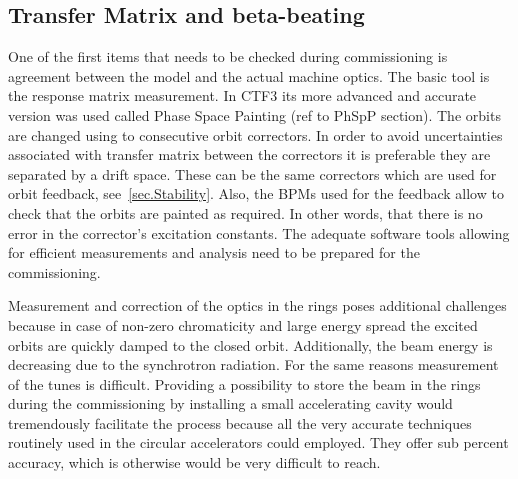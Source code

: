 \subsection{Transfer Matrix and beta-beating}

One of the first items that needs to be checked during commissioning is 
agreement between the model and the actual machine optics.
The basic tool is the response matrix measurement. 
In CTF3 its more advanced and accurate version was used called Phase Space Painting (ref to PhSpP section).
The orbits are changed using to consecutive orbit correctors. In order to avoid uncertainties associated 
with transfer matrix between the correctors it is preferable they are separated by a drift space.
These can be the same correctors which are used for orbit feedback, see~\ref{sec.Stability}. 
Also, the BPMs used for the feedback allow to check that the orbits are painted as required.
In other words, that there is no error in the corrector's excitation constants.
The adequate software tools allowing for efficient measurements and analysis need to be prepared for the commissioning.

Measurement and correction of the optics in the rings poses additional challenges
because in case of non-zero chromaticity and large energy spread the excited orbits are quickly damped to
the closed orbit. Additionally, the beam energy is decreasing due to the synchrotron radiation.
For the same reasons measurement of the tunes is difficult.
Providing a possibility to store the beam in the rings during the commissioning by installing a small
accelerating cavity would tremendously facilitate the process because all the very accurate techniques
routinely used in the circular accelerators could employed. They offer sub percent accuracy, which is 
otherwise would be very difficult to reach. 
